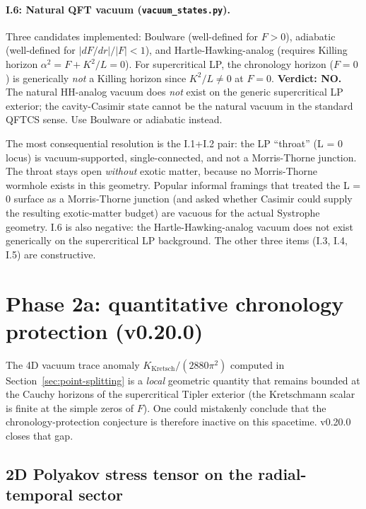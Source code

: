 \documentclass[11pt,a4paper]{article}
\begin{document}
\paragraph{I.6: Natural QFT vacuum (\texttt{vacuum\_states.py}).}
Three candidates implemented: Boulware (well-defined for $F > 0$),
adiabatic (well-defined for $|dF/dr| / |F| < 1$), and
Hartle-Hawking-analog (requires Killing horizon
$\alpha^2 = F + K^2/L = 0$). For supercritical LP, the chronology
horizon ($F = 0$) is generically \emph{not} a Killing horizon since
$K^2 / L \neq 0$ at $F = 0$.
\textbf{Verdict: NO.} The natural HH-analog vacuum does \emph{not}
exist on the generic supercritical LP exterior; the cavity-Casimir
state cannot be the natural vacuum in the standard QFTCS sense.
Use Boulware or adiabatic instead.

The most consequential resolution is the I.1+I.2 pair: the LP
``throat'' (L = 0 locus) is vacuum-supported, single-connected,
and not a Morris-Thorne junction. The throat stays open
\emph{without} exotic matter, because no Morris-Thorne wormhole
exists in this geometry. Popular informal framings that treated
the L = 0 surface as a Morris-Thorne junction (and asked whether
Casimir could supply the resulting exotic-matter budget) are
vacuous for the actual Systrophe geometry. I.6 is also negative:
the Hartle-Hawking-analog vacuum does not exist generically on the
supercritical LP background. The other three items (I.3, I.4, I.5)
are constructive.

\section{Phase 2a: quantitative chronology protection (v0.20.0)}
\label{sec:phase2a}

The 4D vacuum trace anomaly $K_{\text{Kretsch}} / (2880 \pi^2)$
computed in Section~\ref{sec:point-splitting} is a \emph{local}
geometric quantity that remains bounded at the Cauchy horizons of
the supercritical Tipler exterior (the Kretschmann scalar is finite
at the simple zeros of $F$). One could mistakenly conclude that the
chronology-protection conjecture is therefore inactive on this
spacetime. v0.20.0 closes that gap.

\subsection{2D Polyakov stress tensor on the radial-temporal sector}
\end{document}
